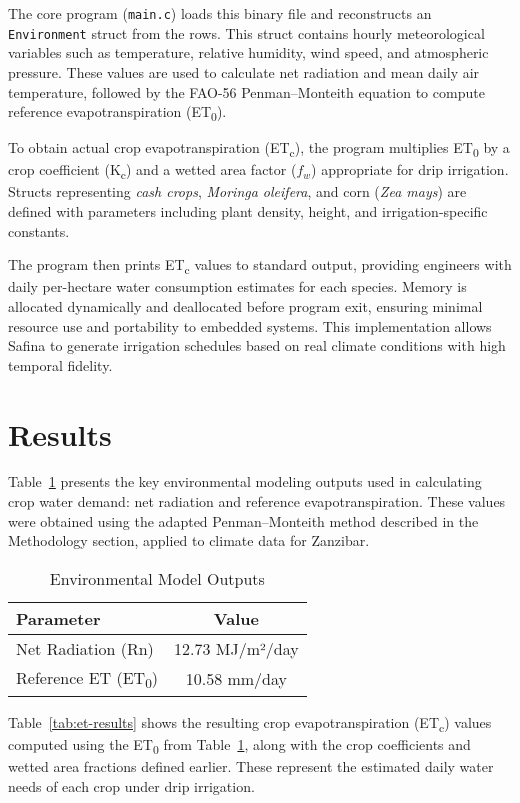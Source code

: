\documentclass[twocolumn]{article}
\begin{document}
The core program (\texttt{main.c}) loads this binary file and reconstructs an \texttt{Environment} struct from the rows. This struct contains hourly meteorological variables such as temperature, relative humidity, wind speed, and atmospheric pressure. These values are used to calculate net radiation and mean daily air temperature, followed by the FAO-56 Penman–Monteith equation to compute reference evapotranspiration (ET\textsubscript{0}).

To obtain actual crop evapotranspiration (ET\textsubscript{c}), the program multiplies ET\textsubscript{0} by a crop coefficient (K\textsubscript{c}) and a wetted area factor (\( f_w \)) appropriate for drip irrigation. Structs representing \textit{cash crops}, \textit{Moringa oleifera}, and corn (\textit{Zea mays}) are defined with parameters including plant density, height, and irrigation-specific constants.

The program then prints ET\textsubscript{c} values to standard output, providing engineers with daily per-hectare water consumption estimates for each species. Memory is allocated dynamically and deallocated before program exit, ensuring minimal resource use and portability to embedded systems. This implementation allows Safina to generate irrigation schedules based on real climate conditions with high temporal fidelity.

\section{Results}

Table~\ref{tab:env-results} presents the key environmental modeling outputs used in calculating crop water demand: net radiation and reference evapotranspiration. These values were obtained using the adapted Penman--Monteith method described in the Methodology section, applied to climate data for Zanzibar.

\begin{table}[h]
\centering
\caption{Environmental Model Outputs}
\label{tab:env-results}
\begin{tabular}{lc}
\toprule
\textbf{Parameter} & \textbf{Value} \\
\midrule
Net Radiation (Rn) & 12.73 MJ/m²/day \\
Reference ET (ET\textsubscript{0}) & 10.58 mm/day \\
\bottomrule
\end{tabular}
\end{table}

Table~\ref{tab:et-results} shows the resulting crop evapotranspiration (ET\textsubscript{c}) values computed using the ET\textsubscript{0} from Table~\ref{tab:env-results}, along with the crop coefficients and wetted area fractions defined earlier. These represent the estimated daily water needs of each crop under drip irrigation.
\end{document}
